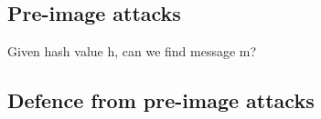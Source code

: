 
\subsection{Pre-image attacks}

Given hash value h, can we find message m?

\subsection{Defence from pre-image attacks}

